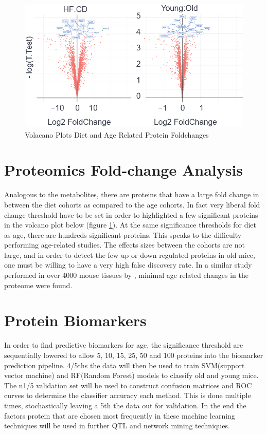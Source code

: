 \documentclass[a4paper,11pt,twoside]{book}
\begin{document}
			\begin{figure}
			\centering
			\includegraphics[width=\linewidth]{3.Proteomics/Protein_foldchanges}
			\caption{Volacano Plots Diet and Age Related Protein Foldchanges}
			\label{volcano plot: Protein Diet and Age Foldchanges}
		\end{figure}
		
	\section{Proteomics Fold-change Analysis}
	
	Analogous to the metabolites, there are proteins that have a large fold change in between the diet cohorts as compared to the age cohorts. In fact very liberal fold change threshold have to be set in order to highlighted a few significant proteins in the volcano plot below (figure \ref{volcano plot: Protein Diet and Age Foldchanges}). At the same significance thresholds for diet as age, there are hundreds significant proteins. This speaks to the difficulty performing age-related studies. The effects sizes between the cohorts are not large, and in order to detect the few up or down regulated proteins in old mice, one must be willing to have a very high false discovery rate. In a similar study performed in over 4000 mouse tissues by \citeauthor{Walther2011AccurateQuantification}, minimal age related changes in the proteome were found. 
	

	
	\section{Protein Biomarkers}
	
	In order to find predictive biomarkers for age, the significance threshold are sequentially lowered to allow 5, 10, 15, 25, 50 and 100 proteins into the biomarker prediction pipeline. 4/5ths the data will then be used to train SVM(support vector machine) and RF(Random Forest) models to classify old and young mice. The n1/5 validation set will be used to construct confusion matrices and ROC curves to determine the classifier accuracy each method. This is done multiple times, stochastically leaving a 5th the data out for validation. In the end the factors protein that are chosen most frequently in these machine learning techniques will be used in further QTL and network mining techniques.
	
\end{document}
